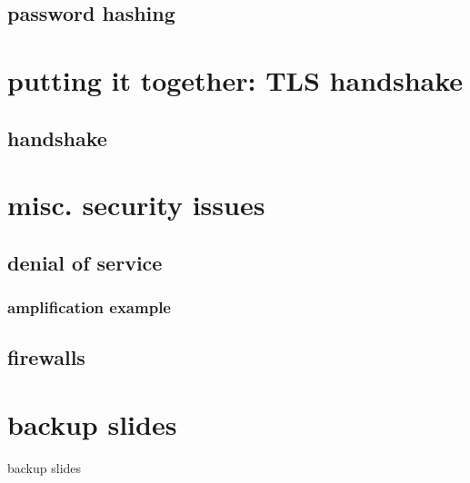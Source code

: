
\subsection{password hashing}

\section{putting it together: TLS handshake}

\subsection{handshake}

\section{misc. security issues}

\subsection{denial of service}


\subsubsection{amplification example}

\subsection{firewalls} %



\section{backup slides}
\begin{frame}{backup slides}
\end{frame}
